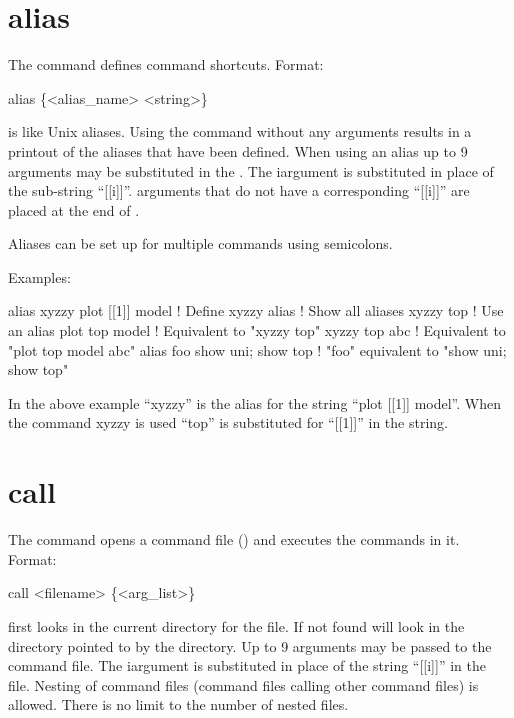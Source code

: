 \section{alias}
\label{s:alias}

The  command defines command shortcuts. Format:
\begin{example}
  alias \{<alias_name> <string>\}
\end{example}

\vskip 0.2in

 is like Unix aliases. Using the  command without
any arguments results in a printout of the aliases that have been
defined. When using an alias up to 9 arguments may be substituted in
the . The i\Th argument is substituted in place of the
sub-string ``[[i]]''.  arguments that do not have a corresponding
``[[i]]'' are placed at the end of .

Aliases can be set up for multiple commands using semicolons.

Examples:
\begin{example}
    alias xyzzy plot [[1]] model  ! Define xyzzy
    alias                         ! Show all aliases
    xyzzy top                     ! Use an alias
    plot top model                ! Equivalent to "xyzzy top"
    xyzzy top abc                 ! Equivalent to "plot top model abc"
    alias foo  show uni; show top ! "foo" equivalent to "show uni; show top"
\end{example}
In the above example ``xyzzy'' is the alias for the string ``plot [[1]]
model''.  When the command xyzzy is used ``top'' is substituted
for ``[[1]]'' in the string.

\section{call}
\label{s:call}

The  command opens a command file () and
executes the commands in it. 
Format:
\begin{example}
  call <filename> \{<arg_list>\}  \Strut
\end{example}

\vskip 0.2in 
\tao first looks in the current directory for the file. If not
found \tao will look in the directory pointed to by the
 directory.  Up to 9 arguments may be passed to
the command file. The i\Th argument is substituted in place of the
string ``[[i]]'' in the file. Nesting of command files (command files
calling other command files) is allowed. There is no limit to the
number of nested files.

